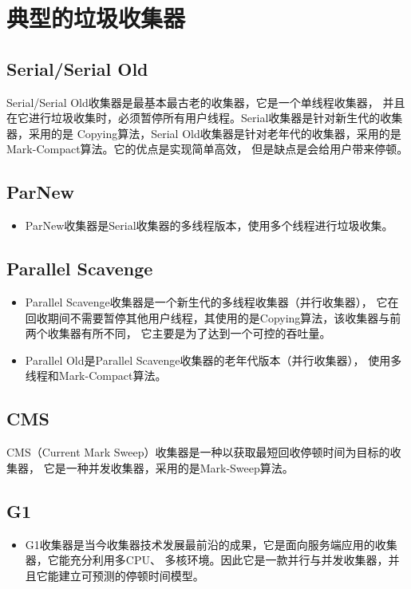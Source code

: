\section{典型的垃圾收集器}
\subsection{Serial/Serial Old}
Serial/Serial Old收集器是最基本最古老的收集器，它是一个单线程收集器，
并且在它进行垃圾收集时，必须暂停所有用户线程。Serial收集器是针对新生代的收集器，采用的是
Copying算法，Serial Old收集器是针对老年代的收集器，采用的是Mark-Compact算法。它的优点是实现简单高效，
但是缺点是会给用户带来停顿。
\subsection{ParNew}
\begin{itemize}
	\item ParNew收集器是Serial收集器的多线程版本，使用多个线程进行垃圾收集。
\end{itemize}
\subsection{Parallel Scavenge}
\begin{itemize}
	\item Parallel Scavenge收集器是一个新生代的多线程收集器（并行收集器），
	它在回收期间不需要暂停其他用户线程，其使用的是Copying算法，该收集器与前两个收集器有所不同，
	它主要是为了达到一个可控的吞吐量。
	\item Parallel Old是Parallel Scavenge收集器的老年代版本（并行收集器），
	使用多线程和Mark-Compact算法。
\end{itemize}
\subsection{CMS}
CMS（Current Mark Sweep）收集器是一种以获取最短回收停顿时间为目标的收集器，
它是一种并发收集器，采用的是Mark-Sweep算法。
\subsection{G1}
\begin{itemize}
	\item G1收集器是当今收集器技术发展最前沿的成果，它是面向服务端应用的收集器，它能充分利用多CPU、
	多核环境。因此它是一款并行与并发收集器，并且它能建立可预测的停顿时间模型。
\end{itemize}